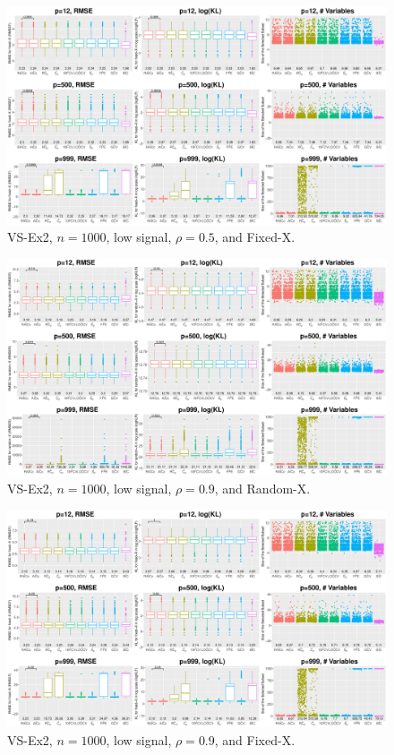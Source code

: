 \begin{figure}[!ht]
\centering
\includegraphics[width=\textwidth]{figures/supplement/fixedx_VS-Ex2_n1000_lsnr_rho05.eps}
\caption{VS-Ex2, $n=1000$, low signal, $\rho=0.5$, and Fixed-X.}
\end{figure}
\clearpage
\begin{figure}[!ht]
\centering
\includegraphics[width=\textwidth]{figures/supplement/randomx_VS-Ex2_n1000_lsnr_rho09.eps}
\caption{VS-Ex2, $n=1000$, low signal, $\rho=0.9$, and Random-X.}
\end{figure}
\begin{figure}[!ht]
\centering
\includegraphics[width=\textwidth]{figures/supplement/fixedx_VS-Ex2_n1000_lsnr_rho09.eps}
\caption{VS-Ex2, $n=1000$, low signal, $\rho=0.9$, and Fixed-X.}
\end{figure}
